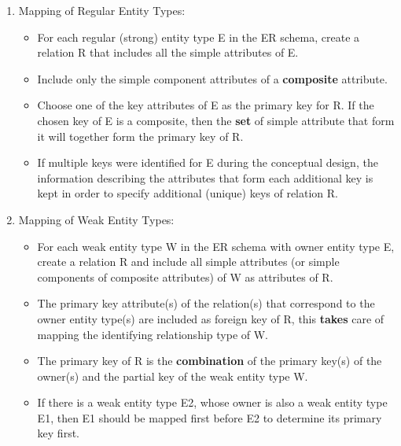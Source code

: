 \documentclass[10pt]{article}
\newcommand{\tf}{\textbf}
\begin{document}
\begin{enumerate}
	\item Mapping of Regular Entity Types:
	\begin{itemize}
		\item For each regular (strong) entity type E in the ER schema, create a relation R that includes all the simple attributes of E.
		\item Include only the simple component attributes of a \tf{composite} attribute.
		\item Choose one of the key attributes of E as the primary key for R. If the chosen key of E is a composite, then the \tf{set} of simple attribute that form it will together form the primary key of R.
		\item If multiple keys were identified for E during the conceptual design, the information describing the attributes that form each additional key is kept in order to specify additional (unique) keys of relation R.
	\end{itemize}

	\item Mapping of Weak Entity Types:
	\begin{itemize}
		\item For each weak entity type W in the ER schema with owner entity type E, create a relation R and include all simple attributes (or simple components of composite attributes) of W as attributes of R.
		\item The primary key attribute(s) of the relation(s) that correspond to the owner entity type(s) are included as foreign key of R, this \tf{takes} care of mapping the identifying relationship type of W.
		\item The primary key of R is the \tf{combination} of the primary key(s) of the owner(s) and the partial key of the weak entity type W.
		\item If there is a weak entity type E2, whose owner is also a weak entity type E1, then E1 should be mapped first before E2 to determine its primary key first.
	\end{itemize}


\end{enumerate}
\end{document}
